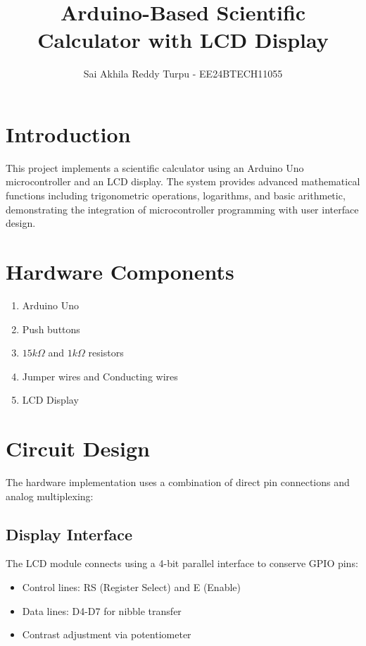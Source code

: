 \documentclass[journal]{IEEEtran}
\begin{document}
\title{Arduino-Based Scientific Calculator with LCD Display}
\author{Sai Akhila Reddy Turpu - EE24BTECH11055}

\maketitle

\section{Introduction}
This project implements a scientific calculator using an Arduino Uno microcontroller and an LCD display. The system provides advanced mathematical functions including trigonometric operations, logarithms, and basic arithmetic, demonstrating the integration of microcontroller programming with user interface design.

\section{Hardware Components}
\begin{enumerate}
    \item Arduino Uno
    \item Push buttons
    \item $15k\Omega$ and $1k\Omega$ resistors
    \item Jumper wires and Conducting wires
    \item LCD Display
\end{enumerate}

\section{Circuit Design}
The hardware implementation uses a combination of direct pin connections and analog multiplexing:

\subsection{Display Interface}
The LCD module connects using a 4-bit parallel interface to conserve GPIO pins:
\begin{itemize}
    \item Control lines: RS (Register Select) and E (Enable)
    \item Data lines: D4-D7 for nibble transfer
    \item Contrast adjustment via potentiometer
\end{itemize}
\end{document}
